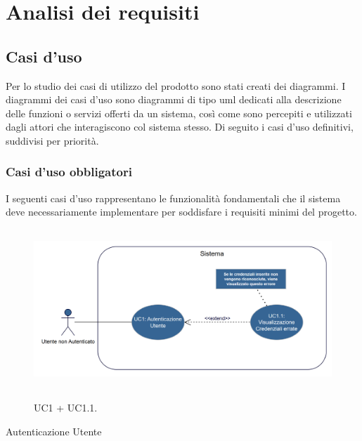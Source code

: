 \chapter{Analisi dei requisiti}
\label{chap:analisi-requisiti}

\section{Casi d'uso}
Per lo studio dei casi di utilizzo del prodotto sono stati creati dei diagrammi.
I diagrammi dei casi d'uso sono diagrammi di tipo \gls{uml} dedicati alla descrizione delle funzioni o servizi offerti da un sistema, così come sono percepiti e utilizzati dagli attori che interagiscono col sistema stesso.
Di seguito i casi d'uso definitivi, suddivisi per priorità.

\newpage

\subsection{Casi d'uso obbligatori}
I seguenti casi d'uso rappresentano le funzionalità fondamentali che il sistema deve necessariamente implementare per soddisfare i requisiti minimi del progetto.

\begin{figure}[H]
    \centering
    \includegraphics[alt={Diagramma UML Autenticazione Utente}, height=6cm]{img/usecase/UC1+UC1.1.png}
    \caption{UC1 + UC1.1.}
    \label{fig:uc1_login}
\end{figure}

\begin{usecase}{1}{Autenticazione Utente}
\label{uc:uc1_login}
\end{usecase}

